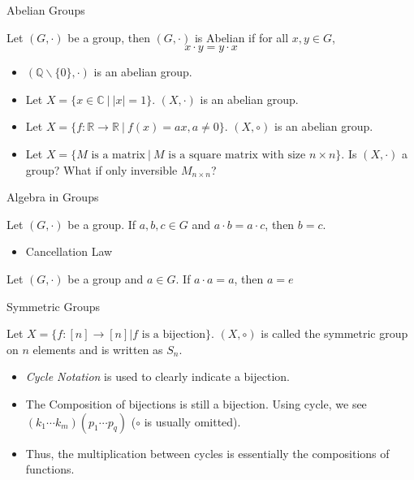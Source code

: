 \begin{frame}{Abelian Groups}
    \begin{definition}
        Let $(G,\cdot)$ be a group, then $(G,\cdot)$ is Abelian if for all $x,y\in G$, $$x\cdot y=y\cdot x$$
    \end{definition}
    \begin{example}
        \begin{itemize}
            \item $(\mathbb{Q}\backslash\{0\},\cdot)$ is an abelian group.
            \item Let $X=\{x\in \mathbb{C}\ |\ |x|=1\}$. $(X,\cdot)$ is an abelian group.
            \item Let $X=\{f:\mathbb{R}\to\mathbb{R}\ |\ f(x)=ax, a\neq0\}$. $(X,\circ)$ is an abelian group.
            \item Let $X=\{M \text{ is a matrix}\ |\ M \text{ is a square matrix with size }n\times n\}$. Is $(X,\cdot)$ a group? What if only inversible $M_{n\times n}$?
        \end{itemize}
    \end{example}
\end{frame}

\begin{frame}{Algebra in Groups}
    \begin{lemma}
        Let $(G,\cdot)$ be a group. If $a,b,c\in G$ and $a\cdot b=a\cdot c$, then $b=c$.
    \end{lemma}
    \begin{itemize}
        \item Cancellation Law
    \end{itemize}
    \begin{corollary}
        Let $(G,\cdot)$ be a group and $a\in G$. If $a\cdot a=a$, then $a=e$
    \end{corollary}
\end{frame}

\begin{frame}{Symmetric Groups}
    \begin{definition}
        Let $X=\{f:[n]\to[n]| f\text{ is a bijection}\}$. $(X,\circ)$ is called the symmetric group on $n$ elements and is written as $S_n$.
    \end{definition}
    \begin{itemize}
        \item \emph{Cycle Notation} is used to clearly indicate a bijection.
        \item The Composition of bijections is still a bijection. Using cycle, we see $(k_1\cdots k_m)(p_1\cdots p_q)$ ($\circ$ is usually omitted).
        \item Thus, the multiplication between cycles is essentially the compositions of functions.
    \end{itemize}
\end{frame}

